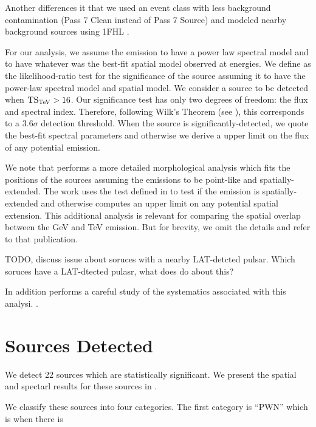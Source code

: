 Another differences it that we used an event class with less background
contamination (Pass 7 Clean instead of Pass 7 Source) and modeled
nearby background sources using \ac{1FHL} \cite{ackermann_2013a_first-fermi-lat}.

For our analysis, we assume the \gev emission to have a power law spectral
model and to have whatever was the best-fit spatial model observed at
\tev energies.  We define \tstev as the likelihood-ratio test for the
significance of the source assuming it to have the power-law spectral
model and \tev spatial model.  We consider a source to be detected when
$\mathrm{TS}_\text{TeV} > 16$.  Our significance test has only two degrees of freedom:
the flux and spectral index.  Therefore, following Wilk's Theorem (see
), this corresponds to a $3.6\sigma$
detection threshold. When the source is significantly-detected, we quote
the best-fit spectral parameters and otherwise we derive a upper limit
on the flux of any potential emission.

We note that \cite{acero_2013a_constraints-galactic} performs a more
detailed morphological analysis which fits the positions of the sources
assuming the emissions to be point-like and spatially-extended.  The work
uses the \tsext test defined in  to test if
the emission is spatially-extended and otherwise computes an upper limit
on any potential spatial extension.  This additional analysis is relevant
for comparing the spatial overlap between the GeV and TeV emission. But
for brevity, we omit the details and refer to that publication.

TODO, discuss issue about soruces with a nearby LAT-detcted pulsar.
Which soruces have a LAT-dtected pulasr, what does 
\cite{acero_2013a_constraints-galactic} do about this?

In addition \cite{acero_2013a_constraints-galactic} performs
a careful study of the systematics associated with this analysi.
.

\section{Sources Detected}

We detect 22 sources which are statistically significant. We
present the spatial and spectarl results for these sources in
.

We classify these sources into four categories.
The first category is ``PWN'' which is when there is 

